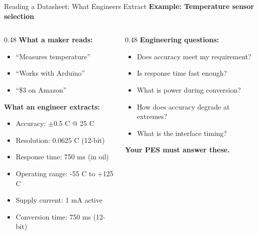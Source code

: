 \documentclass[aspectratio=169,11pt]{beamer}
\begin{document}
\begin{frame}{Reading a Datasheet: What Engineers Extract}
    \textbf{Example: Temperature sensor selection}
    
    \vspace{0.3cm}
    \begin{columns}[T]
        \begin{column}{0.48\textwidth}
            \textbf{What a maker reads:}
            \begin{itemize}
                \item ``Measures temperature''
                \item ``Works with Arduino''
                \item ``\$3 on Amazon''
            \end{itemize}
            
            \vspace{0.3cm}
            \textbf{What an engineer extracts:}
            \begin{itemize}
                \item Accuracy: $\pm$0.5 C @ 25 C
                \item Resolution: 0.0625 C (12-bit)
                \item Response time: 750 ms (in oil)
                \item Operating range: -55 C to +125 C
                \item Supply current: 1 mA active
                \item Conversion time: 750 ms (12-bit)
            \end{itemize}
        \end{column}
        \begin{column}{0.48\textwidth}
            \textbf{Engineering questions:}
            \begin{itemize}
                \item Does accuracy meet my requirement?
                \item Is response time fast enough?
                \item What is power during conversion?
                \item How does accuracy degrade at extremes?
                \item What is the interface timing?
            \end{itemize}
            
            \vspace{0.3cm}
            \textbf{Your PES must answer these.}
        \end{column}
    \end{columns}
\end{frame}
\end{document}
